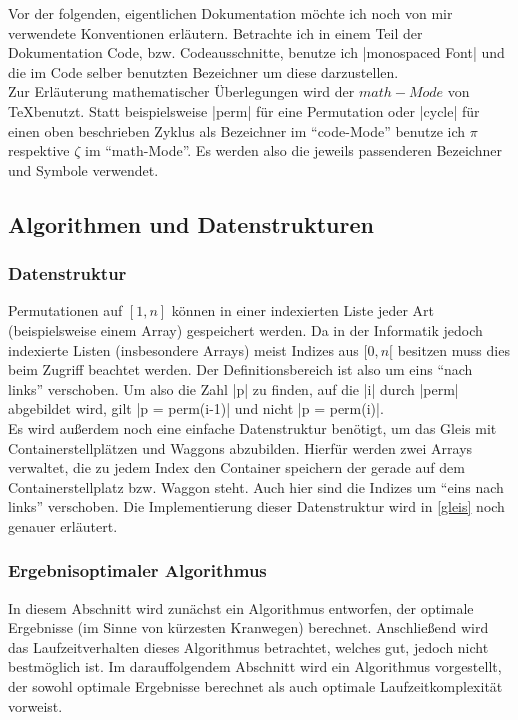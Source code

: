 Vor der folgenden, eigentlichen Dokumentation möchte ich noch von mir verwendete Konventionen erläutern.
Betrachte ich in einem Teil der Dokumentation Code, bzw. Codeausschnitte,
benutze ich |monospaced Font| und die im Code selber benutzten Bezeichner um diese darzustellen. \\
Zur Erläuterung mathematischer Überlegungen wird der $math-Mode$ von \TeX benutzt.
Statt beispielsweise |perm| für eine Permutation oder |cycle| für einen oben beschrieben Zyklus als Bezeichner im ``code-Mode'' benutze ich $\pi$ respektive $\zeta$ im ``math-Mode''.
Es werden also die jeweils passenderen Bezeichner und Symbole verwendet.
\subsection{Algorithmen und Datenstrukturen}
\subsubsection{Datenstruktur}
Permutationen auf $[1,n]$ können in einer indexierten Liste jeder Art (beispielsweise einem Array) gespeichert werden.
Da in der Informatik jedoch indexierte Listen (insbesondere Arrays) meist Indizes aus $[0,n[$ besitzen muss dies beim Zugriff beachtet werden.
Der Definitionsbereich ist also um eins ``nach links'' verschoben.
Um also die Zahl |p| zu finden, auf die |i| durch |perm| abgebildet wird, gilt |p = perm(i-1)| und nicht |p = perm(i)|. \\
Es wird außerdem noch eine einfache Datenstruktur benötigt, um das Gleis mit Containerstellplätzen und Waggons abzubilden.
Hierfür werden zwei Arrays verwaltet, die zu jedem Index den Container speichern der gerade auf dem Containerstellplatz bzw. Waggon steht.
Auch hier sind die Indizes um ``eins nach links'' verschoben.
Die Implementierung dieser Datenstruktur wird in \ref{gleis} noch genauer erläutert.
\subsubsection{Ergebnisoptimaler Algorithmus}
In diesem Abschnitt wird zunächst ein Algorithmus entworfen, der optimale Ergebnisse (im Sinne von kürzesten Kranwegen) berechnet.
Anschließend wird das Laufzeitverhalten dieses Algorithmus betrachtet, welches gut, jedoch nicht bestmöglich ist.
Im darauffolgendem Abschnitt wird ein Algorithmus vorgestellt, der sowohl optimale Ergebnisse berechnet als auch optimale Laufzeitkomplexität vorweist.
